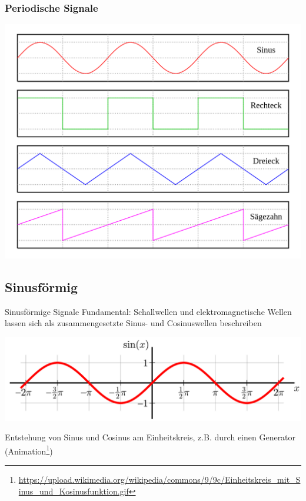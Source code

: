 \begin{frame}
  \frametitle{Periodische Signale}

  \begin{center}
    \includegraphics[width=\textwidth,height=0.9\textheight,keepaspectratio]{a11/Waveforms_de.png}
    \tiny \hyperlink{refs}{\cite{wc}}
  \end{center}

\end{frame}

\subsection{Sinusförmig}

\begin{frame}{Sinusförmige Signale}
  Fundamental: Schallwellen und elektromagnetische Wellen lassen sich als zusammengesetzte Sinus- und Cosinuswellen beschreiben

  \begin{center}
    \includegraphics[width=\textwidth,height=.4\textheight,keepaspectratio]{a11/Sine.pdf}
    {\tiny \hyperlink{refs}{\cite{wm}}}
  \end{center}

  Entstehung von Sinus und Cosinus am Einheitskreis, z.B. durch einen Generator (Animation\footnote{
  \url{https://upload.wikimedia.org/wikipedia/commons/9/9c/Einheitskreis_mit_Sinus_und_Kosinusfunktion.gif}})

\end{frame}

